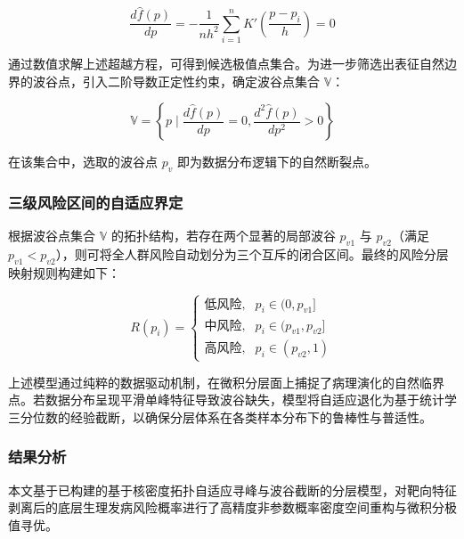 \documentclass[12pt]{article}
\begin{document}
	\begin{equation}
		\frac{d\hat{f}(p)}{dp} = -\frac{1}{nh^2} \sum_{i=1}^{n} K'\left( \frac{p-p_i}{h} \right) = 0
	\end{equation}
	
	{\songti{}
		通过数值求解上述超越方程，可得到候选极值点集合。为进一步筛选出表征自然边界的波谷点，引入二阶导数正定性约束，确定波谷点集合 $\mathbb{V}$：
		\par}
	
	\begin{equation}
		\mathbb{V} = \left\{ p \mid \frac{d\hat{f}(p)}{dp} = 0, \frac{d^2\hat{f}(p)}{dp^2} > 0 \right\}
	\end{equation}
	
	{\songti{}
		在该集合中，选取的波谷点 $p_v$ 即为数据分布逻辑下的自然断裂点。
		\par}
	
	\subsubsection{三级风险区间的自适应界定}
	{\songti{}
		根据波谷点集合 $\mathbb{V}$ 的拓扑结构，若存在两个显著的局部波谷 $p_{v1}$ 与 $p_{v2}$（满足 $p_{v1} < p_{v2}$），则可将全人群风险自动划分为三个互斥的闭合区间。最终的风险分层映射规则构建如下：
		\par}
	
	\begin{equation}
		R(p_i)=
		\begin{cases}
			\text{低风险}, & p_i \in (0,p_{v1}] \\
			\text{中风险}, & p_i \in (p_{v1},p_{v2}] \\
			\text{高风险}, & p_i \in (p_{v2},1)
		\end{cases}
	\end{equation}
	
	{\songti{}
		上述模型通过纯粹的数据驱动机制，在微积分层面上捕捉了病理演化的自然临界点。若数据分布呈现平滑单峰特征导致波谷缺失，模型将自适应退化为基于统计学三分位数的经验截断，以确保分层体系在各类样本分布下的鲁棒性与普适性。
		\par}
	
	\subsubsection{结果分析}
	{\songti{}
		本文基于已构建的基于核密度拓扑自适应寻峰与波谷截断的分层模型，对靶向特征剥离后的底层生理发病风险概率进行了高精度非参数概率密度空间重构与微积分极值寻优。
		\par}
	
\end{document}
